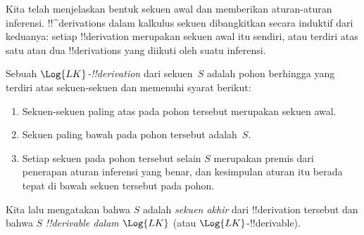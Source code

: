 \documentclass[../../../include/open-logic-section]{subfiles}
\begin{document}
      {}
      {}


\begin{explain}
Kita telah menjelaskan bentuk sekuen awal dan memberikan aturan-aturan
inferensi. !!^{derivation}s dalam kalkulus sekuen dibangkitkan secara
induktif dari keduanya: setiap !!{derivation} merupakan sekuen awal itu
sendiri, atau terdiri atas satu atau dua !!{derivation}s yang diikuti oleh
suatu inferensi.
\end{explain}

\begin{defn}
Sebuah \emph{$\Log{LK}$-!!{derivation}} dari sekuen~$S$ adalah pohon
berhingga yang terdiri atas sekuen-sekuen dan memenuhi syarat berikut:
\begin{enumerate}
\item Sekuen-sekuen paling atas pada pohon tersebut merupakan sekuen awal.
\item Sekuen paling bawah pada pohon tersebut adalah~$S$.
\item Setiap sekuen pada pohon tersebut selain $S$ merupakan premis dari
  penerapan aturan inferensi yang benar, dan kesimpulan aturan itu berada
  tepat di bawah sekuen tersebut pada pohon.
\end{enumerate}
Kita lalu mengatakan bahwa $S$ adalah \emph{sekuen akhir} dari
!!{derivation} tersebut dan bahwa $S$ \emph{!!{derivable} dalam
$\Log{LK}$} (atau $\Log{LK}$-!!{derivable}).
\end{defn}
\end{document}
